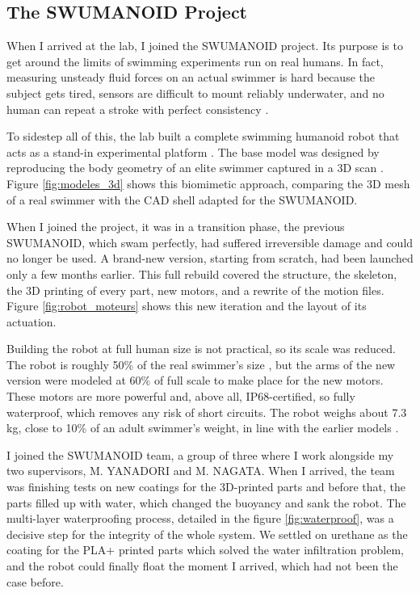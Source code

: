 \documentclass{tropLaClasse}
\begin{document}
\subsection{The SWUMANOID Project}

When I arrived at the lab, I joined the SWUMANOID project. Its purpose is to get around the limits of swimming experiments run on real humans. In fact, measuring unsteady fluid forces on an actual swimmer is hard because the subject gets tired, sensors are difficult to mount reliably underwater, and no human can repeat a stroke with perfect consistency \cite{chung2014swimming} \cite{nakashima2016realization}.

To sidestep all of this, the lab built a complete swimming humanoid robot that acts as a stand-in experimental platform \cite{chung2014swimming} \cite{nakashima2016realization}. The base model was designed by reproducing the body geometry of an elite swimmer captured in a 3D scan \cite{chung2013free} \cite{nakashima2016realization}. Figure \ref{fig:modeles_3d} \label{text:modeles_3d} shows this biomimetic approach, comparing the 3D mesh of a real swimmer with the CAD shell adapted for the SWUMANOID.



When I joined the project, it was in a transition phase, the previous SWUMANOID, which swam perfectly, had suffered irreversible damage and could no longer be used. A brand-new version, starting from scratch, had been launched only a few months earlier. This full rebuild covered the structure, the skeleton, the 3D printing of every part, new motors, and a rewrite of the motion files. Figure \ref{fig:robot_moteurs} \label{text:robot_moteurs} shows this new iteration and the layout of its actuation.



Building the robot at full human size is not practical, so its scale was reduced. The robot is roughly 50\% of the real swimmer's size \cite{chung2013free} \cite{chung2014swimming}, but the arms of the new version were modeled at 60\% of full scale to make place for the new motors. These motors are more powerful and, above all, IP68-certified, so fully waterproof, which removes any risk of short circuits. The robot weighs about 7.3 kg, close to 10\% of an adult swimmer's weight, in line with the earlier models \cite{chung2013free} \cite{nakashima2016realization}.

I joined the SWUMANOID team, a group of three where I work alongside my two supervisors, M. YANADORI and M. NAGATA. When I arrived, the team was finishing tests on new coatings for the 3D-printed parts and before that, the parts filled up with water, which changed the buoyancy and sank the robot. The multi-layer waterproofing process, detailed in the figure \ref{fig:waterproof}, was a decisive step for the integrity of the whole system. We settled on urethane as the coating for the PLA+ printed parts which solved the water infiltration problem, and the robot could finally float the moment I arrived, which had not been the case before. \label{text:waterproof}
\end{document}
